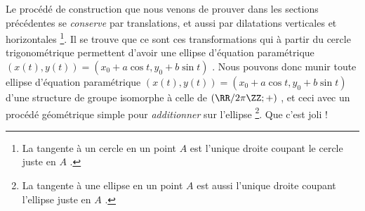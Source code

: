 Le procédé de construction que nous venons de prouver dans les sections précédentes se \emph{\og conserve \fg} par translations, et aussi par dilatations verticales et horizontales
\footnote{
	La tangente à un cercle en un point $A$ est l'unique droite coupant le cercle juste en $A$ .
}.
Il se trouve que ce sont ces transformations qui à partir du cercle trigonométrique permettent d'avoir une ellipse d'équation paramétrique $(x(t) , y(t)) = (x_0 + a \cos t , y_0 + b \sin t)$ .
Nous pouvons donc munir toute ellipse d'équation paramétrique $(x(t) , y(t)) = (x_0 + a \cos t , y_0 + b \sin t)$ d'une structure de groupe isomorphe à celle de $(\RR / 2 \pi \ZZ ; +)$ , et ceci avec un procédé géométrique simple pour \emph{\og additionner \fg} sur l'ellipse
\footnote{
	La tangente à une ellipse en un point $A$ est aussi l'unique droite coupant l'ellipse juste en $A$ .
}.
Que c'est joli !
